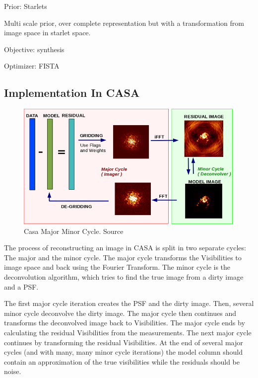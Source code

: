 Prior: Starlets

Multi scale prior,  over complete representation but with a transformation from image space in starlet space.


Objective: synthesis

Optimizer: FISTA

\pagebreak
\subsection{Implementation In CASA}

\begin{figure}
	\centering
	\vspace{-15pt}
	\includegraphics[width=0.9\linewidth]{./chapters/04.cs/img/casa_major_minor.png}
	\caption{Casa Major Minor Cycle. Source \cite{casa2018major}}
	\label{cs:major}
	\vspace{-10pt}
\end{figure}

The process of reconstructing an image in CASA is split in two separate cycles: The major and the minor cycle. The major cycle transforms the Visibilities to image space and back using the Fourier Transform. The minor cycle is the deconvolution algorithm, which tries to find the true image from a dirty image and a PSF. 

The first major cycle iteration creates the PSF and the dirty image. Then, several minor cycle deconvolve the dirty image. The major cycle then continues and transforms the deconvolved image back to Visibilities. The major cycle ends by calculating the residual Visibilities from the measurements. The next major cycle continues by transforming the residual Visibilities. At the end of several major cycles (and with many, many minor cycle iterations) the model column should contain an approximation of the true visibilities while the residuals should be noise.


